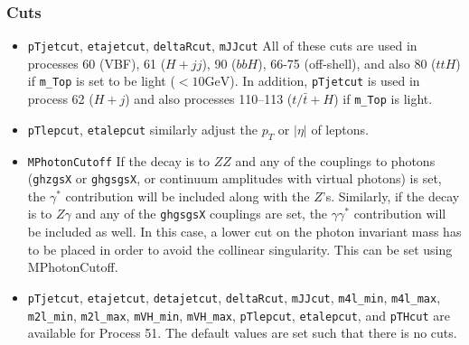 \documentclass[aps,superscriptaddress,nofootinbib]{revtex4}
\begin{document}
\subsubsection{Cuts}
\begin{itemize}
\item \verb|pTjetcut|, \verb|etajetcut|, \verb|deltaRcut|, \verb|mJJcut| All of these cuts are used in processes 60 (VBF), 61 ($H+jj$), 90 ($bbH$), 66-75 (off-shell), and also 80 ($ttH$) if \verb|m_Top| is set to be light ($<10 \text{GeV}$).  In addition, \verb|pTjetcut| is used in process 62 ($H+j$) and also processes 110--113 ($t/\bar{t}+H$) if \verb|m_Top| is light.
\item \verb|pTlepcut|, \verb|etalepcut| similarly adjust the $p_T$ or $|\eta|$ of leptons.
\item \verb|MPhotonCutoff| If the decay is to $ZZ$ and any of the couplings to photons (\verb|ghzgsX| or \verb|ghgsgsX|, or continuum amplitudes with virtual photons) is set, the $\gamma^*$ contribution will be included along with the $Z$'s.  Similarly, if the decay is to $Z\gamma$ and any of the \verb|ghgsgsX| couplings are set, the $\gamma\gamma^*$ contribution will be included as well.  In this case, a lower cut on the photon invariant mass has to be placed in order to avoid the collinear singularity.  This can be set using MPhotonCutoff.
\item \verb|pTjetcut|, \verb|etajetcut|, \verb|detajetcut|, \verb|deltaRcut|, \verb|mJJcut|, \verb|m4l_min|, \verb|m4l_max|, \verb|m2l_min|, \verb|m2l_max|, \verb|mVH_min|, \verb|mVH_max|, \verb|pTlepcut|, \verb|etalepcut|, and \verb|pTHcut| are available for Process 51. The default values are set such that there is no cuts.
\end{itemize}
\end{document}
